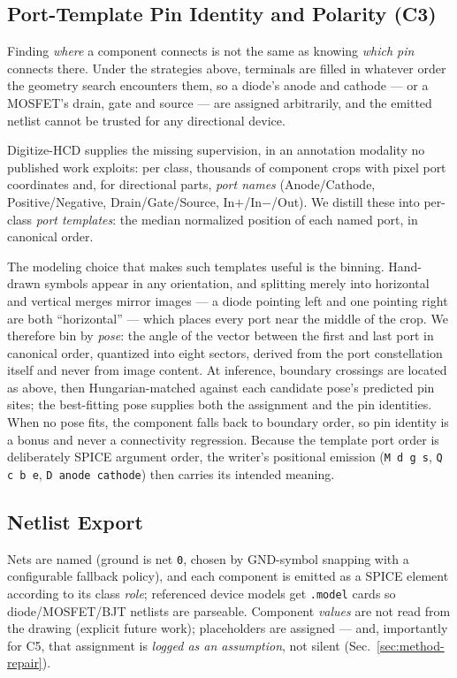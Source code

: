 \subsection{Port-Template Pin Identity and Polarity (C3)}
\label{sec:method-ports}
Finding \emph{where} a component connects is not the same as knowing
\emph{which pin} connects there. Under the strategies above, terminals
are filled in whatever order the geometry search encounters them, so a
diode's anode and cathode — or a MOSFET's drain, gate and source — are
assigned arbitrarily, and the emitted netlist cannot be trusted for any
directional device.

Digitize-HCD supplies the missing supervision, in an annotation
modality no published work exploits: per class, thousands of component
crops with pixel port coordinates and, for directional parts,
\emph{port names} (Anode/Cathode, Positive/Negative, Drain/Gate/Source,
In$+$/In$-$/Out). We distill these into per-class \emph{port
templates}: the median normalized position of each named port, in
canonical order.

The modeling choice that makes such templates useful is the binning.
Hand-drawn symbols appear in any orientation, and splitting merely into
horizontal and vertical merges mirror images — a diode pointing left
and one pointing right are both ``horizontal'' — which places every
port near the middle of the crop. We therefore bin by \emph{pose}: the
angle of the vector between the first and last port in canonical order,
quantized into eight sectors, derived from the port constellation
itself and never from image content. At inference, boundary crossings
are located as above, then Hungarian-matched against each candidate
pose's predicted pin sites; the best-fitting pose supplies both the
assignment and the pin identities. When no pose fits, the component
falls back to boundary order, so pin identity is a bonus and never a
connectivity regression. Because the template port order is
deliberately SPICE argument order, the writer's positional emission
(\texttt{M d g s}, \texttt{Q c b e}, \texttt{D anode cathode}) then
carries its intended meaning.

\subsection{Netlist Export}
\label{sec:method-netlist}
Nets are named (ground is net \texttt{0}, chosen by GND-symbol
snapping with a configurable fallback policy), and each component is
emitted as a SPICE element according to its class \emph{role};
referenced device models get \texttt{.model} cards so diode/MOSFET/BJT
netlists are parseable. Component \emph{values} are not read from the
drawing (explicit future work); placeholders are assigned — and,
importantly for C5, that assignment is \emph{logged as an assumption},
not silent (Sec.~\ref{sec:method-repair}).

